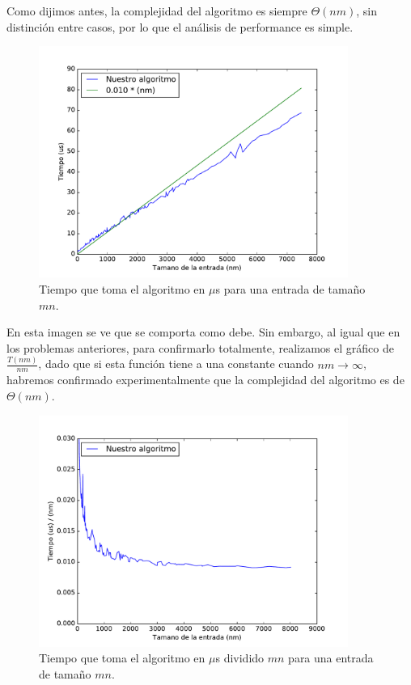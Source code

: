 

Como dijimos antes, la complejidad del algoritmo es siempre $\Theta(n m)$, sin distinción entre casos, por lo que el análisis de performance es simple.

\begin{figure}[H]
 \centering
	\includegraphics[width=0.9\textwidth]{img/exp/problema3-promedio.pdf}
	\caption{\footnotesize Tiempo que toma el algoritmo en $\mu$s para una entrada de tamaño $mn$.}
	\label{fig:problema3-promedio}
\end{figure}

En esta imagen se ve que se comporta como debe. Sin embargo, al igual que en los problemas anteriores, para confirmarlo totalmente, realizamos el gráfico de $\frac{T(nm)}{nm}$, dado que si esta función tiene a una constante cuando $nm \to \infty$, habremos confirmado experimentalmente que la complejidad del algoritmo es de $\Theta(n m)$.

\begin{figure}[H]
 \centering
	\includegraphics[width=0.9\textwidth]{img/exp/problema3-promedio2.pdf}
	\caption{\footnotesize Tiempo que toma el algoritmo en $\mu$s dividido $mn$ para una entrada de tamaño $mn$.}
	\label{fig:problema3-promedio2}
\end{figure}


